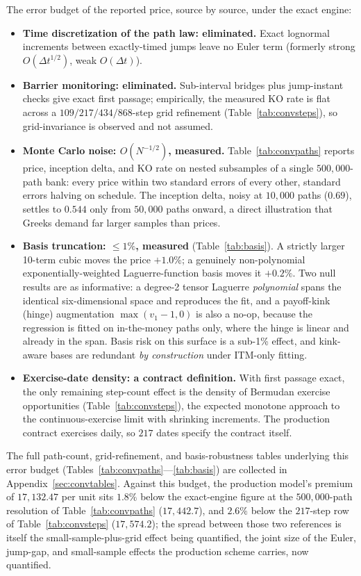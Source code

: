 \documentclass[11pt,a4paper]{article}
\begin{document}
The error budget of the reported price, source by source, under the exact engine:
\begin{itemize}
\item \textbf{Time discretization of the path law: eliminated.} Exact lognormal increments between exactly-timed jumps leave no Euler term (formerly strong $O(\Delta t^{1/2})$, weak $O(\Delta t)$).
\item \textbf{Barrier monitoring: eliminated.} Sub-interval bridges plus jump-instant checks give exact first passage; empirically, the measured KO rate is flat across a $109/217/434/868$-step grid refinement (Table~\ref{tab:convsteps}), so grid-invariance is observed and not assumed.
\item \textbf{Monte Carlo noise: $O(N^{-1/2})$, measured.} Table~\ref{tab:convpaths} reports price, inception delta, and KO rate on nested subsamples of a single $500{,}000$-path bank: every price within two standard errors of every other, standard errors halving on schedule. The inception delta, noisy at $10{,}000$ paths ($0.69$), settles to $0.544$ only from $50{,}000$ paths onward, a direct illustration that Greeks demand far larger samples than prices.
\item \textbf{Basis truncation: $\le1\%$, measured} (Table~\ref{tab:basis}). A strictly larger 10-term cubic moves the price $+1.0\%$; a genuinely non-polynomial exponentially-weighted Laguerre-function basis moves it $+0.2\%$. Two null results are as informative: a degree-2 tensor Laguerre \emph{polynomial} spans the identical six-dimensional space and reproduces the fit, and a payoff-kink (hinge) augmentation $\max(v_1-1,0)$ is also a no-op, because the regression is fitted on in-the-money paths only, where the hinge is linear and already in the span. Basis risk on this surface is a sub-1\% effect, and kink-aware bases are redundant \emph{by construction} under ITM-only fitting.
\item \textbf{Exercise-date density: a contract definition.} With first passage exact, the only remaining step-count effect is the density of Bermudan exercise opportunities (Table~\ref{tab:convsteps}), the expected monotone approach to the continuous-exercise limit with shrinking increments. The production contract exercises daily, so $217$ dates specify the contract itself.
\end{itemize}
The full path-count, grid-refinement, and basis-robustness tables underlying this error budget (Tables~\ref{tab:convpaths}---\ref{tab:basis}) are collected in Appendix~\ref{sec:convtables}. Against this budget, the production model's premium of $17{,}132.47$ per unit sits $1.8\%$ below the exact-engine figure at the $500{,}000$-path resolution of Table~\ref{tab:convpaths} ($17{,}442.7$), and $2.6\%$ below the $217$-step row of Table~\ref{tab:convsteps} ($17{,}574.2$); the spread between those two references is itself the small-sample-plus-grid effect being quantified, the joint size of the Euler, jump-gap, and small-sample effects the production scheme carries, now quantified.
\end{document}
